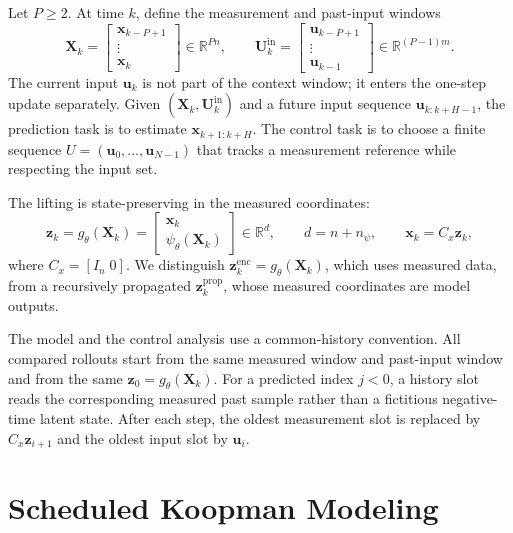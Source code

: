 ﻿\documentclass[journal]{IEEEtran}
\newcommand{\vx}{\mathbf{x}}
\newcommand{\vu}{\mathbf{u}}
\newcommand{\vz}{\mathbf{z}}
\newcommand{\mU}{\mathbf{U}}
\newcommand{\mX}{\mathbf{X}}
\newcommand{\R}{\mathbb{R}}
\begin{document}
Let $P\ge2$. At time $k$, define the measurement and past-input windows
\begin{equation}
    \mX_k=\begin{bmatrix}\vx_{k-P+1}\\ \vdots\\ \vx_k\end{bmatrix}\in\R^{Pn},\qquad
    \mU_k^{\mathrm{in}}=\begin{bmatrix}\vu_{k-P+1}\\ \vdots\\ \vu_{k-1}\end{bmatrix}\in\R^{(P-1)m}.
    \label{eq:history_windows}
\end{equation}
The current input $\vu_k$ is not part of the context window; it enters the one-step update separately. Given $(\mX_k,\mU_k^{\mathrm{in}})$ and a future input sequence $\vu_{k:k+H-1}$, the prediction task is to estimate $\vx_{k+1:k+H}$. The control task is to choose a finite sequence $U=(\vu_0,\ldots,\vu_{N-1})$ that tracks a measurement reference while respecting the input set.

The lifting is state-preserving in the measured coordinates:
\begin{equation}
    \vz_k=g_\theta(\mX_k)=\begin{bmatrix}\vx_k\\ \psi_\theta(\mX_k)\end{bmatrix}\in\R^d,
    \qquad d=n+n_\psi,
    \qquad \vx_k=C_x\vz_k,
    \label{eq:state_preserving_lifting}
\end{equation}
where $C_x=[I_n\;0]$. We distinguish $\vz_k^{\mathrm{enc}}=g_\theta(\mX_k)$, which uses measured data, from a recursively propagated $\vz_k^{\mathrm{prop}}$, whose measured coordinates are model outputs.

The model and the control analysis use a common-history convention. All compared rollouts start from the same measured window and past-input window and from the same $\vz_0=g_\theta(\mX_k)$. For a predicted index $j<0$, a history slot reads the corresponding measured past sample rather than a fictitious negative-time latent state. After each step, the oldest measurement slot is replaced by $C_x\vz_{i+1}$ and the oldest input slot by $\vu_i$.

\section{Scheduled Koopman Modeling}
\label{sec:model}
\end{document}
